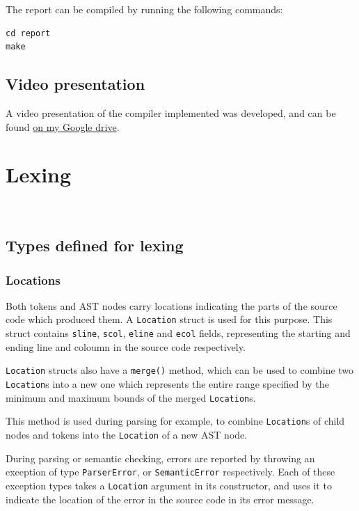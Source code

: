 \documentclass[11pt,a4paper]{scrartcl}
\begin{document}
The report can be compiled by running the following commands:
\begin{verbatim}
cd report
make
\end{verbatim}

\subsection{Video presentation}

A video presentation of the compiler implemented was developed, and can be found \href{https://drive.google.com/file/d/1YSH7jUDW-PpR4YmvCW0ssTWVA2O2pTK9/view?usp=sharing}{on my Google drive}.

\newpage

\section{Lexing}~\label{sec:lexer}

\subsection{Types defined for lexing}

\subsubsection{Locations}

Both tokens and AST nodes carry locations indicating the parts of the source code which produced them. A \verb|Location| struct is used for this purpose. This struct contains \verb|sline|, \verb|scol|, \verb|eline| and \verb|ecol| fields, representing the starting and ending line and coloumn in the source code respectively.

\verb|Location| structs also have a \verb|merge()| method, which can be used to combine two \verb|Location|s into a new one which represents the entire range specified by the minimum and maximum bounds of the merged \verb|Location|s.

This method is used during parsing for example, to combine \verb|Location|s of child nodes and tokens into the \verb|Location| of a new AST node.

During parsing or semantic checking, errors are reported by throwing an exception of type \verb|ParserError|, or \verb|SemanticError| respectively. Each of these exception types takes a \verb|Location| argument in its constructor, and uses it to indicate the location of the error in the source code in its error message.
\end{document}

